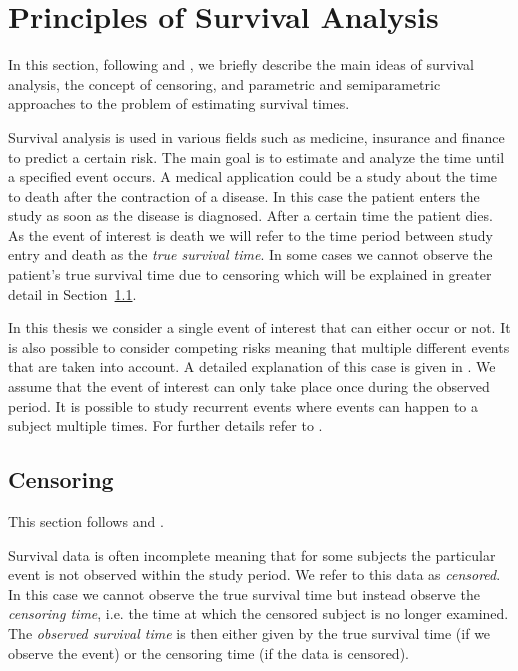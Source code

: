 \documentclass[12pt, a4paper]{scrartcl}
\theoremstyle{definition}
\theoremstyle{plain}
\numberwithin{equation}{section}
\numberwithin{figure}{section}
\numberwithin{table}{section}
\begin{document}
	\section{Principles of Survival Analysis}\label{sec:sa}
		
	In this section, following \citet*{sabook} and \citet*{mathsabook}, we briefly describe the main ideas of survival analysis, the concept of censoring, and parametric and semiparametric approaches to the problem of estimating survival times.
	
	Survival analysis is used in various fields such as medicine, insurance and finance to predict a certain risk.
	The main goal is to estimate and analyze the time until a specified event occurs.
	A medical application could be a study about the time to death after the contraction of a disease.
	In this case the patient enters the study as soon as the disease is diagnosed.
	After a certain time the patient dies.
	As the event of interest is death we will refer to the time period between study entry and death as the \emph{true survival time}.
	In some cases we cannot observe the patient's true survival time due to censoring which will be explained in greater detail in Section~\ref{censoring}.
	
	In this thesis we consider a single event of interest that can either occur or not.
	It is also possible to consider competing risks meaning that multiple different events that are taken into account.
	A detailed explanation of this case is given in \citet*[Chapter~8]{bookfailuretime}.
	We assume that the event of interest can only take place once during the observed period.
	It is possible to study recurrent events where events can happen to a subject multiple times.
	For further details refer to \citet*[Chapter~9]{bookfailuretime}.
	
	\subsection{Censoring} \label{censoring}
	
	This section follows \citet*{sabook} and \citet*{mathsabook}.
	
	Survival data is often incomplete meaning that for some subjects the particular event is not observed within the study period.
	We refer to this data as \emph{censored}.
	In this case we cannot observe the true survival time but instead observe the \emph{censoring time}, {i.e.} the time at which the censored subject is no longer examined.
	The \emph{observed survival time} is then either given by the true survival time (if we observe the event) or the censoring time (if the data is censored).
	
\end{document}
